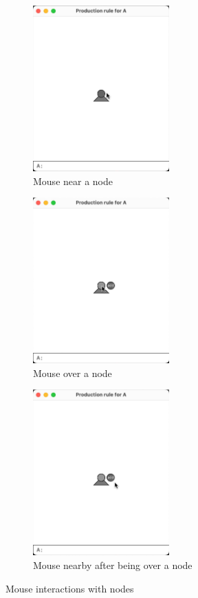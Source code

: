 \documentclass[12pt,twoside]{reedthesis}
\begin{document}
	\begin{figure}[h]
	\centering
	\begin{subfigure}{0.5\textwidth}
		\centering
		\includegraphics[height = 2.5in, frame]{Images/HowItWorks4A}
		\caption{Mouse near a node}
		\label {HowItWorks4A}
	\end{subfigure}%
	\begin{subfigure}{0.5\textwidth}
		\centering
		\includegraphics[height = 2.5in, frame]{Images/HowItWorks4B}
		\caption{Mouse over a node}
		\label {HowItWorks4B}
	\end{subfigure}
	\begin{subfigure}{0.5\textwidth}
		\centering
		\includegraphics[height = 2.5in, frame]{Images/HowItWorks4C}
		\caption{Mouse nearby after being over a node}
		\label {HowItWorks4C}
	\end{subfigure}
	\caption{Mouse interactions with nodes}
	\label{MouseInteraction}
	\end{figure}
\end{document}
